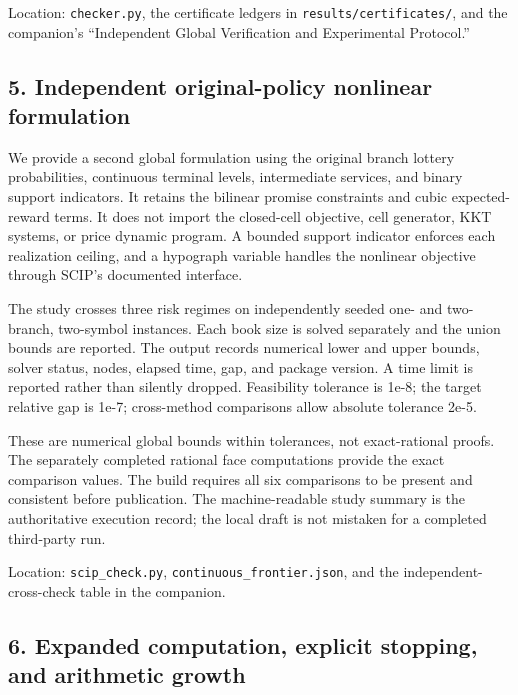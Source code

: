 \documentclass[11pt,letterpaper]{article}
\begin{document}
Location: \nolinkurl{checker.py}, the certificate ledgers in \nolinkurl{results/certificates/}, and the companion's “Independent Global Verification and Experimental Protocol.”



\subsection*{5. Independent original-policy nonlinear formulation}


We provide a second global formulation using the original branch lottery probabilities, continuous terminal levels, intermediate services, and binary support indicators. It retains the bilinear promise constraints and cubic expected-reward terms. It does not import the closed-cell objective, cell generator, KKT systems, or price dynamic program. A bounded support indicator enforces each realization ceiling, and a hypograph variable handles the nonlinear objective through SCIP's documented interface.



The study crosses three risk regimes on independently seeded one- and two-branch, two-symbol instances. Each book size is solved separately and the union bounds are reported. The output records numerical lower and upper bounds, solver status, nodes, elapsed time, gap, and package version. A time limit is reported rather than silently dropped. Feasibility tolerance is 1e-8; the target relative gap is 1e-7; cross-method comparisons allow absolute tolerance 2e-5.



These are numerical global bounds within tolerances, not exact-rational proofs. The separately completed rational face computations provide the exact comparison values. The build requires all six comparisons to be present and consistent before publication. The machine-readable study summary is the authoritative execution record; the local draft is not mistaken for a completed third-party run.



Location: \nolinkurl{scip_check.py}, \nolinkurl{continuous_frontier.json}, and the independent-cross-check table in the companion.



\subsection*{6. Expanded computation, explicit stopping, and arithmetic growth}
\end{document}
